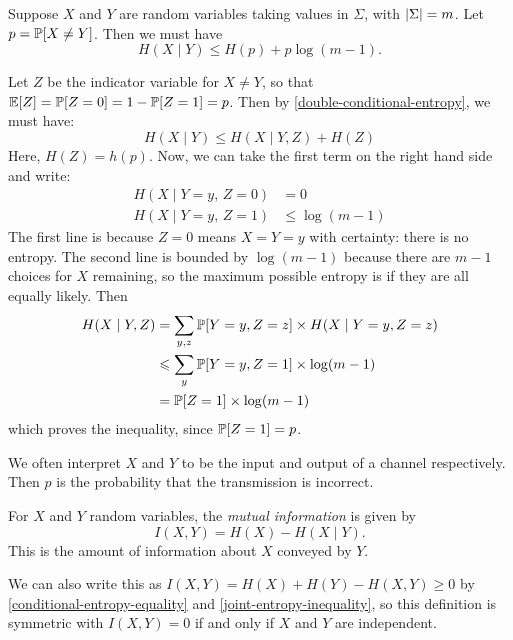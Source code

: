 \documentclass{article}
\begin{document}
\begin{theorem}
	\label{fanos-inequality}
    Suppose $X$ and $Y$ are random variables taking values in $\Sigma$,
    with $\abs \Sigma = m$. Let $p = \P[X \neq Y]$.
    Then we must have
    \[
	H(X \mid Y) \leq H(p) + p \log(m-1).
	\] 
\end{theorem}

\begin{prf}
	Let $Z$ be the indicator variable for $X \neq Y$,
	so that $\E[Z] = \P[Z=0] = 1- \P[Z=1] = p$.
	Then by \ref{double-conditional-entropy}, we must have:
	\[
	H(X \mid Y) \leq H(X \mid Y, Z) + H(Z)
	\]
	Here, $H(Z) = h(p)$.
	Now, we can take the first term on the right hand side and write:
	\begin{align*}
    	H(X \mid Y = y, \, Z = 0) &= 0 \\
    	H(X \mid Y = y, \, Z = 1) &\leq \log(m-1)
	\end{align*}
	The first line is because $Z = 0$ means $X = Y = y$ with certainty:
	there is no entropy.
	The second line is bounded by $\log(m-1)$
	because there are $m-1$ choices for $X$ remaining,
	so the maximum possible entropy is if they are all equally likely. Then
	\begin{align*}
		H(X \mid Y, Z)
		&= \sum_{y,z} \P[Y=y, Z=z] \times H(X \mid Y = y, Z = z) \\
		&\leq \sum_{y} \P[Y=y, Z=1] \times \log(m-1) \\
		&= \P[Z = 1] \times \log (m-1)
	\end{align*}
	which proves the inequality, since $\P[Z=1] = p$.
\end{prf}

\begin{note}
	We often interpret $X$ and $Y$ to be
	the input and output of a channel respectively.
	Then $p$ is the probability that the transmission is incorrect.
\end{note}

\begin{definition}
    For $X$ and $Y$ random variables,
    the \textit{mutual information} is given by
    \[
	I(X, Y) = H(X) - H(X \mid Y).
	\]
	This is the amount of information about $X$ conveyed by $Y$.
\end{definition}

\begin{corollary}
    We can also write this as $I(X, Y) = H(X) + H(Y) - H(X, Y) \geq 0$
    by \ref{conditional-entropy-equality} and \ref{joint-entropy-inequality},
    so this definition is symmetric
    with $I(X, Y) = 0$ if and only if $X$ and $Y$ are independent.
\end{corollary}
\end{document}
